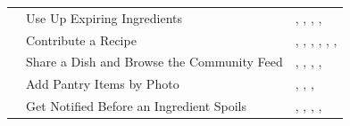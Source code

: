 \begin{tabularx}{\linewidth}{L{1.6cm}L{3.4cm}Y}
 & Use Up Expiring Ingredients & , , , , \\
 & Contribute a Recipe & , , , , , , \\
 & Share a Dish and Browse the Community Feed & , , , , \\
 & Add Pantry Items by Photo & , , , \\
 & Get Notified Before an Ingredient Spoils & , , , , \\
\end{tabularx}
